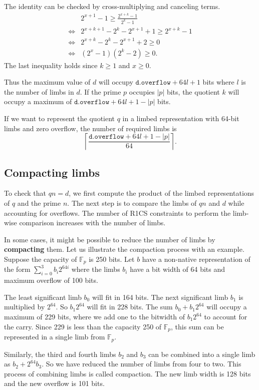 \documentclass[a4paper, 12pt]{article}
\begin{document}
The identity can be checked by cross-multiplying and canceling terms.
\begin{align*}
& 2^{x+1}-1 \ge \frac{2^{x+k}-1}{2^{k}-1} \\
\iff & 2^{x+k+1} - 2^k - 2^{x+1} +1 \ge 2^{x+k} -1 \\
\iff & 2^{x+k} - 2^k - 2^{x+1} + 2 \ge 0 \\
\iff & (2^x-1)(2^k-2) \ge 0.
\end{align*}
The last inequality holds since $k \ge 1$ and $x \ge 0$.

Thus the maximum value of $d$ will occupy $\texttt{d.overflow}+64l+1$ bits where $l$ is the number of limbs in $d$. If the prime $p$ occupies $|p|$ bits, the quotient $k$ will occupy a maximum of $\texttt{d.overflow}+64l+1 -|p|$ bits.

If we want to represent the quotient $q$  in a limbed representation with 64-bit limbs and zero overflow, the number of required limbs is
$$\left\lceil \frac{\texttt{d.overflow}+64l+1 -|p|}{64}\right\rceil.$$

\subsection{Compacting limbs}
\label{sub:compacting_limbs}
To check that $qn = d$, we first compute the product of the limbed representations of $q$ and the prime $n$. The next step is to compare the limbs of $qn$ and $d$ while accounting for overflows. The number of R1CS constraints to perform the limb-wise comparison increases with the number of limbs.

In some cases, it might be possible to reduce the number of limbs by \textbf{compacting} them. Let us illustrate the compaction process with an example. Suppose the capacity of $\mathbb{F}_p$ is 250 bits. Let $b$ have a non-native representation of the form $\sum_{i=0}^3 b_i 2^{64i}$ where the limbs $b_i$ have a bit width of 64 bits and maximum overflow of 100 bits.

The least significant limb $b_0$ will fit in 164 bits. The next significant limb $b_1$ is multiplied by $2^{64}$. So $b_1 2^{64}$ will fit in 228 bits. The sum $b_0 + b_1 2^{64}$ will occupy a maximum of 229 bits, where we add one to the bitwidth of $b_1 2^{64}$ to account for the carry. Since 229 is less than the capacity 250 of $\mathbb{F}_p$, this sum can be represented in a single limb from $\mathbb{F}_p$.

Similarly, the third and fourth limbs $b_2$ and $b_3$ can be combined into a single limb as $b_2 + 2^{64} b_3$. So we have reduced the number of limbs from four to two. This process of combining limbs is called compaction. The new limb width is 128 bits and the new overflow is 101 bits.
\end{document}
